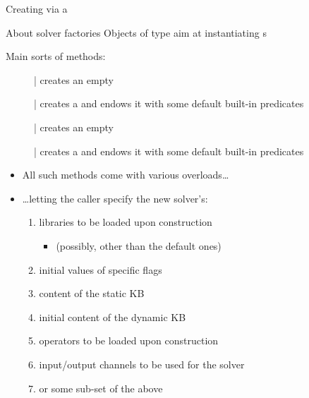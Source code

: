 \documentclass[handout]{beamer}
\begin{document}
\begin{frame}[allowframebreaks]{Creating  via a }
    \begin{block}{About solver factories}\centering
        Objects of type  aim at instantiating s
    \end{block}

    \bigskip

    Main sorts of methods:
    \begin{description}
        \item[] | creates an empty 
        \item[] | creates a  and endows it with some default built-in predicates
        \item[] | creates an empty 
        \item[] | creates a  and endows it with some default built-in predicates
    \end{description}

    \framebreak

    \begin{itemize}
        \item All such methods come with various overloads\ldots
        \item \ldots letting the caller specify the new solver's:
        \begin{enumerate}
            \item libraries to be loaded upon construction
            \begin{itemize}
                \item (possibly, other than the default ones)
            \end{itemize}
            \item initial values of specific flags
            \item content of the static KB
            \item initial content of the dynamic KB
            \item operators to be loaded upon construction
            \item input/output channels to be used for the solver
            \item or some sub-set of the above
        \end{enumerate}
    \end{itemize}


\end{frame}
\end{document}
